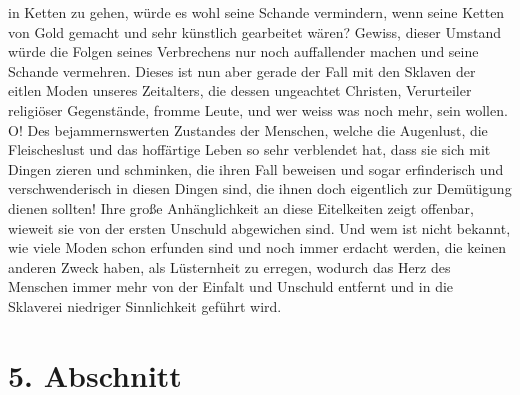 in Ketten zu gehen, würde es wohl seine Schande vermindern, wenn seine Ketten
von Gold gemacht und sehr künstlich gearbeitet wären? Gewiss, dieser
Umstand
würde die Folgen seines Verbrechens nur noch auffallender machen und seine
Schande vermehren. Dieses ist nun aber gerade der Fall mit den
Sklaven der
eitlen Moden unseres Zeitalters, die dessen ungeachtet Christen, Verurteiler
religiöser Gegenstände, fromme Leute, und wer weiss was noch mehr, sein wollen.
O! Des bejammernswerten Zustandes der Menschen, welche die Augenlust, die
Fleischeslust und das hoffärtige Leben so sehr verblendet
hat, dass sie sich mit
Dingen zieren und schminken, die ihren Fall beweisen und sogar
erfinderisch und
verschwenderisch in diesen Dingen sind, die ihnen doch eigentlich zur
Demütigung dienen sollten! Ihre große Anhänglichkeit an diese
Eitelkeiten
zeigt offenbar, wieweit sie von der ersten Unschuld abgewichen
sind. Und wem ist
nicht bekannt, wie viele Moden schon erfunden sind und noch immer
erdacht
werden, die keinen anderen Zweck haben, als Lüsternheit zu erregen, wodurch das
Herz des Menschen immer mehr von der Einfalt und Unschuld entfernt und in die
Sklaverei niedriger Sinnlichkeit geführt wird.

\section{5. Abschnitt} \label{kap14_ab5}

